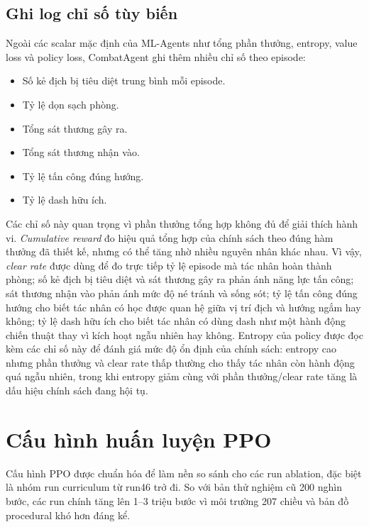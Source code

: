 \subsection{Ghi log chỉ số tùy biến}

Ngoài các scalar mặc định của ML-Agents như tổng phần thưởng, entropy, value loss và policy loss, CombatAgent ghi thêm nhiều chỉ số theo episode:

\begin{itemize}
    \item Số kẻ địch bị tiêu diệt trung bình mỗi episode.
    \item Tỷ lệ dọn sạch phòng.
    \item Tổng sát thương gây ra.
    \item Tổng sát thương nhận vào.
    \item Tỷ lệ tấn công đúng hướng.
    \item Tỷ lệ dash hữu ích.
\end{itemize}

Các chỉ số này quan trọng vì phần thưởng tổng hợp không đủ để giải thích hành vi. \textit{Cumulative reward} đo hiệu quả tổng hợp của chính sách theo đúng hàm thưởng đã thiết kế, nhưng có thể tăng nhờ nhiều nguyên nhân khác nhau. Vì vậy, \textit{clear rate} được dùng để đo trực tiếp tỷ lệ episode mà tác nhân hoàn thành phòng; số kẻ địch bị tiêu diệt và sát thương gây ra phản ánh năng lực tấn công; sát thương nhận vào phản ánh mức độ né tránh và sống sót; tỷ lệ tấn công đúng hướng cho biết tác nhân có học được quan hệ giữa vị trí địch và hướng ngắm hay không; tỷ lệ dash hữu ích cho biết tác nhân có dùng dash như một hành động chiến thuật thay vì kích hoạt ngẫu nhiên hay không. Entropy của policy được đọc kèm các chỉ số này để đánh giá mức độ ổn định của chính sách: entropy cao nhưng phần thưởng và clear rate thấp thường cho thấy tác nhân còn hành động quá ngẫu nhiên, trong khi entropy giảm cùng với phần thưởng/clear rate tăng là dấu hiệu chính sách đang hội tụ.

\section{Cấu hình huấn luyện PPO}

Cấu hình PPO được chuẩn hóa để làm nền so sánh cho các run ablation, đặc biệt là nhóm run curriculum từ run46 trở đi. So với bản thử nghiệm cũ 200 nghìn bước, các run chính tăng lên 1--3 triệu bước vì môi trường 207 chiều và bản đồ procedural khó hơn đáng kể.

